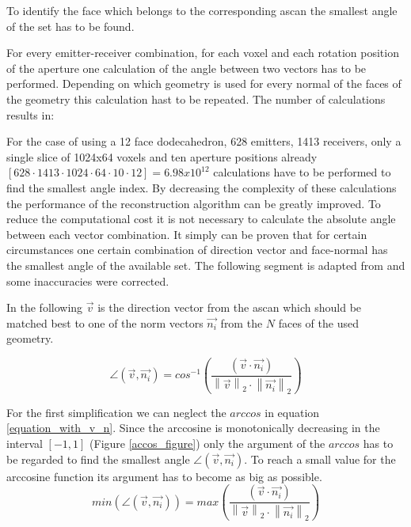 To identify the face which belongs to the corresponding \ac{ascan} the smallest angle of the set has to be found.

\qquad





For every emitter-receiver combination, for each voxel and each rotation position of the aperture one calculation of the angle between two vectors has to be performed. Depending on which geometry is used for every normal of the faces of the geometry this calculation hast to be repeated. The number of calculations results in:


For the case of using a 12 face dodecahedron, 628 emitters, 1413 receivers, only a single slice of 1024x64 voxels and ten aperture positions already $[628 \cdot 1413 \cdot 1024 \cdot 64 \cdot 10 \cdot 12] = 6.98x10^{12}$ calculations have to be  performed to find the smallest angle index. By decreasing the complexity of these calculations the performance of the reconstruction algorithm can be greatly improved. To reduce the computational cost it is not necessary to calculate the absolute angle between each vector combination. It simply can be proven that for certain circumstances one certain combination of direction vector and face-normal has the smallest angle of the available set. The following segment is adapted from \cite{PatrickHucker2014EvaluationRuckstreumodells} and some inaccuracies were corrected.

\qquad

In the following $\overrightarrow{v}$ is the direction vector from the \ac{ascan} which should be matched best to one of the norm vectors $\overrightarrow{n_i}$ from the $N$ faces of the used geometry.


\begin{equation}
\angle (\overrightarrow{v},\overrightarrow{n_i}) =  cos^{-1}\left (    \frac{(\overrightarrow{v} \cdot \overrightarrow{n_i})}{\left \| \overrightarrow{v} \right \|_2  \cdot {\left \| \overrightarrow{n_i} \right \|_2}}  \right ) 
\label{equation_with_v_n}
\end{equation}



For the first simplification we can neglect the $arccos$ in equation \ref{equation_with_v_n}. Since the arccosine is monotonically decreasing in the interval $[-1,1]$ (Figure \ref{accos_figure}) only the argument of the $arccos$ has to be regarded to find the smallest angle $\angle (\overrightarrow{v},\overrightarrow{n_i})$. To reach a small value for the arccosine function its argument has to become as big as possible.
\begin{equation}
min \left (  \angle (\overrightarrow{v},\overrightarrow{n_i}) \right ) =  max \left (    \frac{(\overrightarrow{v} \cdot \overrightarrow{n_i})}{\left \| \overrightarrow{v} \right \|_2  \cdot {\left \| \overrightarrow{n_i} \right \|_2}}  \right ) 
\label{equation_acos_neglect}
\end{equation}

